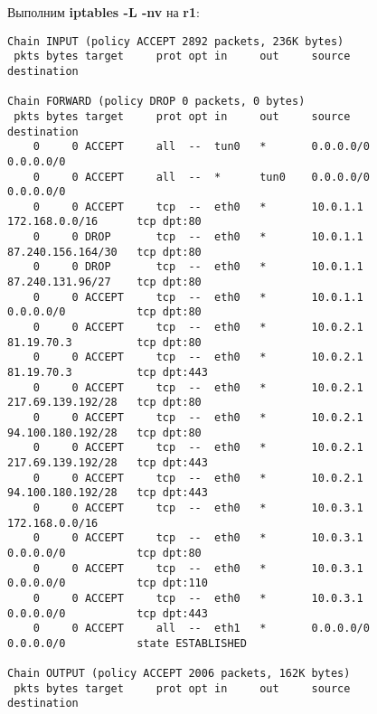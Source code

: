 \documentclass[a4paper,12pt]{article}
\begin{document}
Выполним \textbf{iptables -L -nv} на \textbf{r1}:
\begin{Verbatim}
Chain INPUT (policy ACCEPT 2892 packets, 236K bytes)
 pkts bytes target     prot opt in     out     source               destination         

Chain FORWARD (policy DROP 0 packets, 0 bytes)
 pkts bytes target     prot opt in     out     source               destination         
    0     0 ACCEPT     all  --  tun0   *       0.0.0.0/0            0.0.0.0/0           
    0     0 ACCEPT     all  --  *      tun0    0.0.0.0/0            0.0.0.0/0           
    0     0 ACCEPT     tcp  --  eth0   *       10.0.1.1             172.168.0.0/16      tcp dpt:80 
    0     0 DROP       tcp  --  eth0   *       10.0.1.1             87.240.156.164/30   tcp dpt:80 
    0     0 DROP       tcp  --  eth0   *       10.0.1.1             87.240.131.96/27    tcp dpt:80 
    0     0 ACCEPT     tcp  --  eth0   *       10.0.1.1             0.0.0.0/0           tcp dpt:80 
    0     0 ACCEPT     tcp  --  eth0   *       10.0.2.1             81.19.70.3          tcp dpt:80 
    0     0 ACCEPT     tcp  --  eth0   *       10.0.2.1             81.19.70.3          tcp dpt:443 
    0     0 ACCEPT     tcp  --  eth0   *       10.0.2.1             217.69.139.192/28   tcp dpt:80 
    0     0 ACCEPT     tcp  --  eth0   *       10.0.2.1             94.100.180.192/28   tcp dpt:80 
    0     0 ACCEPT     tcp  --  eth0   *       10.0.2.1             217.69.139.192/28   tcp dpt:443 
    0     0 ACCEPT     tcp  --  eth0   *       10.0.2.1             94.100.180.192/28   tcp dpt:443 
    0     0 ACCEPT     tcp  --  eth0   *       10.0.3.1             172.168.0.0/16      
    0     0 ACCEPT     tcp  --  eth0   *       10.0.3.1             0.0.0.0/0           tcp dpt:80 
    0     0 ACCEPT     tcp  --  eth0   *       10.0.3.1             0.0.0.0/0           tcp dpt:110 
    0     0 ACCEPT     tcp  --  eth0   *       10.0.3.1             0.0.0.0/0           tcp dpt:443 
    0     0 ACCEPT     all  --  eth1   *       0.0.0.0/0            0.0.0.0/0           state ESTABLISHED 

Chain OUTPUT (policy ACCEPT 2006 packets, 162K bytes)
 pkts bytes target     prot opt in     out     source               destination  
\end{Verbatim}
\end{document}
